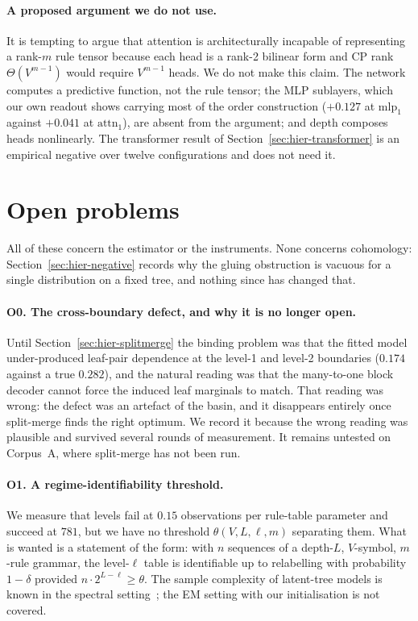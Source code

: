 \paragraph{A proposed argument we do not use.}
It is tempting to argue that attention is architecturally incapable of
representing a rank-$m$ rule tensor because each head is a rank-2 bilinear form
and CP rank $\Theta(V^{m-1})$ would require $V^{m-1}$ heads. We do not make
this claim. The network computes a predictive function, not the rule tensor;
the MLP sublayers, which our own readout shows carrying most of the order
construction ($+0.127$ at $\mathrm{mlp}_1$ against $+0.041$ at
$\mathrm{attn}_1$), are absent from the argument; and depth composes heads
nonlinearly. The transformer result of Section~\ref{sec:hier-transformer} is an
empirical negative over twelve configurations and does not need it.



\section{Open problems}
\label{sec:hier-open}

All of these concern the estimator or the instruments. None concerns
cohomology: Section~\ref{sec:hier-negative} records why the gluing obstruction
is vacuous for a single distribution on a fixed tree, and nothing since has
changed that.

\paragraph{O0. The cross-boundary defect, and why it is no longer open.}
Until Section~\ref{sec:hier-splitmerge} the binding problem was that the fitted
model under-produced leaf-pair dependence at the level-1 and level-2
boundaries ($0.174$ against a true $0.282$), and the natural reading was that
the many-to-one block decoder cannot force the induced leaf marginals to match.
That reading was wrong: the defect was an artefact of the basin, and it
disappears entirely once split-merge finds the right optimum. We record it
because the wrong reading was plausible and survived several rounds of
measurement. It remains untested on Corpus~A, where split-merge has not been
run.

\paragraph{O1. A regime-identifiability threshold.}
We measure that levels fail at $0.15$ observations per rule-table parameter and
succeed at $781$, but we have no threshold $\theta(V, L, \ell, m)$ separating
them. What is wanted is a statement of the form: with $n$ sequences of a
depth-$L$, $V$-symbol, $m$-rule grammar, the level-$\ell$ table is identifiable
up to relabelling with probability $1-\delta$ provided
$n \cdot 2^{L-\ell} \ge \theta$. The sample complexity of latent-tree models is
known in the spectral setting~\cite{choi2011}; the EM setting with our
initialisation is not covered.

